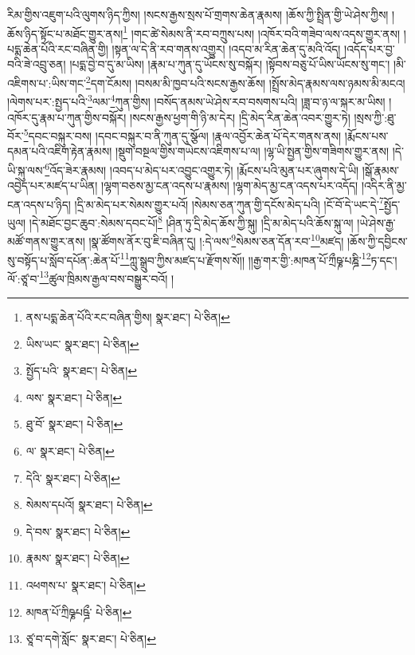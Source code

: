 རིམ་གྱིས་འཇུག་པའི་ལུགས་ཉིད་ཀྱིས། །སངས་རྒྱས་སྲས་པོ་གྲགས་ཆེན་རྣམས། །ཆོས་ཀྱི་སྤྲིན་གྱི་ཡེ་ཤེས་ཀྱིས། །ཆོས་ཉིད་སྟོང་པ་མཐོང་གྱུར་ནས།\footnote{ནས་པདྨ་ཆེན་པོའི་རང་བཞིན་གྱིས།  སྣར་ཐང་།  པེ་ཅིན། } །གང་ཚེ་སེམས་ནི་རབ་བཀྲུས་པས། །འཁོར་བའི་གཟེབ་ལས་འདས་གྱུར་ནས། །པདྨ་ཆེན་པོའི་རང་བཞིན་གྱི། །སྟན་ལ་དེ་ནི་རབ་གནས་འགྱུར། །འདབ་མ་རིན་ཆེན་དུ་མའི་འོད། །འདོད་པར་བྱ་བའི་ཟེ་འབྲུ་ཅན། །པདྨ་བྱེ་བ་དུ་མ་ཡིས། །རྣམ་པ་ཀུན་དུ་ཡོངས་སུ་བསྐོར། །སྟོབས་བཅུ་པོ་ཡིས་ཡོངས་སུ་གང་། །མི་འཇིགས་པ་:ཡིས་གང་\footnote{ཡིས་ཡང་  སྣར་ཐང་།  པེ་ཅིན། }དག་ངོམས། །བསམ་མི་ཁྱབ་པའི་སངས་རྒྱས་ཆོས། །སྤྲོས་མེད་རྣམས་ལས་ཉམས་མི་མངའ། །ལེགས་པར་:སྤྱད་པའི་\footnote{སྤྱོད་པའི་  སྣར་ཐང་།  པེ་ཅིན། }ལམ་\footnote{ལས་  སྣར་ཐང་།  པེ་ཅིན། }ཀུན་གྱིས། །བསོད་ནམས་ཡེ་ཤེས་རབ་བསགས་པའི། །ཟླ་བ་ཉ་ལ་སྐར་མ་ཡིས། །འཁོར་དུ་རྣམ་པ་ཀུན་གྱིས་བསྐོར། །སངས་རྒྱས་ཕྱག་གི་ཉི་མ་དེར། །དྲི་མེད་རིན་ཆེན་འབར་གྱུར་ཏེ། །སྲས་ཀྱི་:ཐུ་བོར་\footnote{ཐུ་བོ་  སྣར་ཐང་།  པེ་ཅིན། }དབང་བསྐུར་བས། །དབང་བསྐུར་བ་ནི་ཀུན་དུ་སྩོལ། །རྣལ་འབྱོར་ཆེན་པོ་དེར་གནས་ནས། །རྨོངས་པས་དམན་པའི་འཇིག་རྟེན་རྣམས། །སྡུག་བསྔལ་གྱིས་གཡེངས་འཇིགས་པ་ལ། །ལྷ་ཡི་སྤྱན་གྱིས་གཟིགས་གྱུར་ནས། །དེ་ཡི་སྐུ་ལས་\footnote{ལ་  སྣར་ཐང་།  པེ་ཅིན། }འོད་ཟེར་རྣམས། །འབད་པ་མེད་པར་འབྱུང་འགྱུར་ཏེ། །རྨོངས་པའི་མུན་པར་ཞུགས་དེ་ཡི། །སྒོ་རྣམས་འབྱེད་པར་མཛད་པ་ཡིན། །ལྷག་བཅས་མྱ་ངན་འདས་པ་རྣམས། །ལྷག་མེད་མྱ་ངན་འདས་པར་འདོད། །འདིར་ནི་མྱ་ངན་འདས་པ་ཉིད། །དྲི་མ་མེད་པར་སེམས་གྱུར་པའོ། །སེམས་ཅན་ཀུན་གྱི་དངོས་མེད་པའི། །ངོ་བོ་དེ་ཡང་དེ་\footnote{དེའི་  སྣར་ཐང་།  པེ་ཅིན། }སྤྱོད་ཡུལ། །དེ་མཐོང་བྱང་ཆུབ་:སེམས་དབང་པོ།\footnote{སེམས་དཔའོ།  སྣར་ཐང་།  པེ་ཅིན། } །ཤིན་ཏུ་དྲི་མེད་ཆོས་ཀྱི་སྐུ། །དྲི་མ་མེད་པའི་ཆོས་སྐུ་ལ། །ཡེ་ཤེས་རྒྱ་མཚོ་གནས་གྱུར་ནས། །སྣ་ཚོགས་ནོར་བུ་ཇི་བཞིན་དུ། །:དེ་ལས་\footnote{དེ་བས་  སྣར་ཐང་།  པེ་ཅིན། }སེམས་ཅན་དོན་རབ་\footnote{རྣམས་  སྣར་ཐང་།  པེ་ཅིན། }མཛད། །ཆོས་ཀྱི་དབྱིངས་སུ་བསྟོད་པ་སློབ་དཔོན་:ཆེན་པོ་\footnote{འཕགས་པ་  སྣར་ཐང་།  པེ་ཅིན། }ཀླུ་སྒྲུབ་ཀྱིས་མཛད་པ་རྫོགས་སོ།། །།རྒྱ་གར་གྱི་:མཁན་པོ་ཀྲྀཥྞ་པཎྜི་\footnote{མཁན་པོ་ཀྲིཥྞཔཥྜྀ་  པེ་ཅིན། }ཏ་དང་། ལོ་:ཙཱ་བ་\footnote{ཙཱ་བ་དགེ་སློང་  སྣར་ཐང་།  པེ་ཅིན། }ཚུལ་ཁྲིམས་རྒྱལ་བས་བསྒྱུར་བའོ། ། 